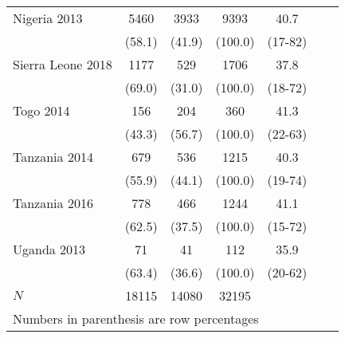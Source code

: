 \begin{tabular}{l*{6}{c}}
Nigeria 2013&                  {5460}&                {3933}&           {9393}&              {40.7}\\
&                                              {(58.1)}&      {(41.9)}&             {(100.0)}&            {(17-82)}\\
Sierra Leone 2018&             {1177}&                {529}&           {1706}&              {37.8}\\
&                                              {(69.0)}&      {(31.0)}&             {(100.0)}&            {(18-72)}\\
Togo 2014&                             {156}&               {204}&           {360}&              {41.3}\\
&                                              {(43.3)}&     {(56.7)}&             {(100.0)}&            {(22-63)}\\
Tanzania 2014&                 {679}&               {536}&           {1215}&              {40.3}\\
&                                              {(55.9)}&     {(44.1)}&             {(100.0)}&            {(19-74)}\\
Tanzania 2016&                 {778}&               {466}&           {1244}&              {41.1}\\
&                                              {(62.5)}&     {(37.5)}&             {(100.0)}&            {(15-72)}\\
Uganda 2013&                   {71}&               {41}&           {112}&              {35.9}\\
&                                              {(63.4)}&     {(36.6)}&             {(100.0)}&            {(20-62)}\\
\hline
\(N\)                          &       {18115}                &  {14080} &    {32195} &            {}\\
\hline\hline
\multicolumn{6}{l}{\footnotesize Numbers in parenthesis are row percentages}\\
\end{tabular}